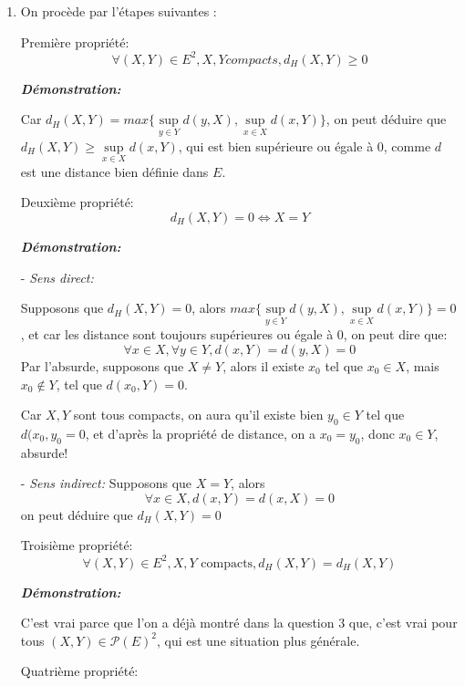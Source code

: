 \documentclass{article}
\begin{document}
\begin{enumerate}
\item On procède par l'étapes suivantes :
\begin{tcolorbox}
Première propriété:
$$
\forall (X, Y) \in E^{2}, X, Y compacts, d_{H}(X,Y) \geq 0
$$
\end{tcolorbox}
\textit{\textbf{Démonstration:}}
\par
Car $d_{H}(X,Y) = max\{\mathop{sup}\limits_{y\in Y} d(y,X),\mathop{sup}\limits_{x\in X} d(x,Y)\}$, on peut déduire que $d_{H}(X,Y) \geq \mathop{sup}\limits_{x\in X}d(x,Y)$, qui est bien supérieure ou égale à 0, comme $d$ est une distance bien définie dans $E$.
\par
\vspace{1em}
\begin{tcolorbox}
Deuxième propriété:
$$d_{H}(X,Y) = 0 \iff X = Y$$
\end{tcolorbox}
\par
\textit{\textbf{Démonstration:}}
\par
- \textit{Sens direct:}
\par
Supposons que $d_H(X,Y) = 0$, alors  $max\{\mathop{sup}\limits_{y\in Y} d(y,X),\mathop{sup}\limits_{x\in X} d(x,Y)\} = 0$, et car les distance sont toujours supérieures ou égale à 0, on peut dire que:
$${\forall}x \in X, {\forall}y \in Y, d(x,Y) =d(y,X)=0$$
Par l'absurde, supposons que $X \neq Y$, alors il existe $x_{0}$ tel que $x_{0}\in X$, mais $x_{0}\notin Y$, tel que $d(x_{0},Y) = 0$.
\par
Car $X,Y$ sont tous compacts, on aura qu'il existe bien $y_{0}\in Y$ tel que $d(x_{0},y_{0} = 0$, et d'après la propriété de distance, on a $x_{0} = y_{0}$, donc $x_{0} \in Y$, absurde!
\par
- \textit{Sens indirect:}
Supposons que $X=Y$, alors $${\forall}x \in X, d(x,Y) =d(x,X)=0$$
on peut déduire que $d_H(X,Y) = 0$
\par
\vspace{1em}
\begin{tcolorbox}
Troisième propriété:
$$
\forall (X,Y) \in E^{2}, X,Y \text{ compacts}, d_{H}(X,Y) =d_{H}(X,Y)
$$
\end{tcolorbox}

\textit{\textbf{Démonstration:}}
\par


C'est vrai parce que l'on a déjà montré dans la question 3 que, c'est vrai pour tous $(X,Y) \in \mathcal{P} (E)^2$, qui est une situation plus générale.
\vspace{1em}
\begin{tcolorbox}
Quatrième propriété:


\end{tcolorbox}
\end{enumerate}
\end{document}
